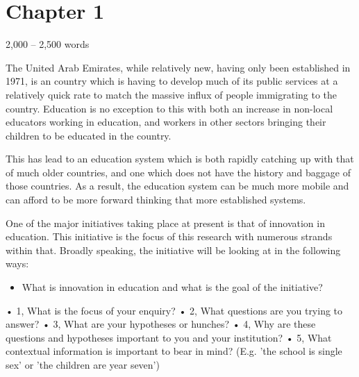 \section{Chapter 1}
2,000 – 2,500 words\citep{Frame61:online}

The United Arab Emirates, while relatively new, having only been established in 1971, is an country which is having to develop much of its public services at a relatively quick rate to match the massive influx of people immigrating to the country. Education is no exception to this with both an increase in non-local educators working in education, and workers in other sectors bringing their children to be educated in the country.

This has lead to an education system which is both rapidly catching up with that of much older countries, and one which does not have the history and baggage of those countries. As a result, the education system can be much more mobile and can afford to be more forward thinking that more established systems. 

One of the major initiatives taking place at present is that of innovation in education. This initiative is the focus of this research with numerous strands within that. Broadly speaking, the initiative will be looking at in the following ways: 

\begin{itemize}
\item What is innovation in education and what is the goal of the initiative?

\end{itemize}

•	1, What is the focus of your enquiry?
•	2, What questions are you trying to answer?
•	3, What are your hypotheses or hunches?
•	4, Why are these questions and hypotheses important to you and your institution?
•	5, What contextual information is important to bear in mind? (E.g. 'the school is single sex' or 'the children are year seven')

